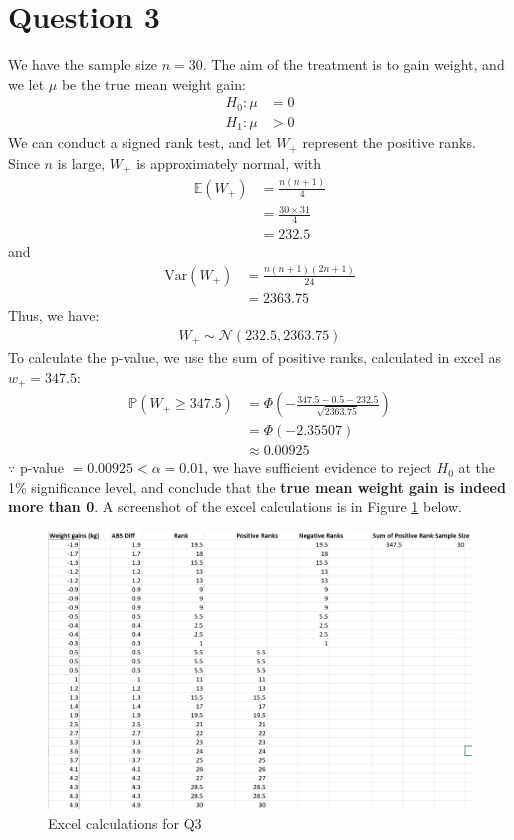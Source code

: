 \documentclass[12pt]{article}
\begin{document}
\section*{Question 3}
We have the sample size $n = 30$. The aim of the treatment is to gain weight, and we let $\mu$ be the true mean weight gain: \begin{align*}
    H_{0}: \mu &= 0 \\ 
    H_{1} : \mu &> 0
\end{align*} We can conduct a signed rank test, and let $W_+$ represent the positive ranks. Since $n$ is large, $W_+$ is approximately normal, with \begin{align*}
    \mathbb{E}(W_+) &= \frac{n(n+1)}{4} \\ 
    &= \frac{30 \times 31}{4} \\ 
    &= 232.5
\end{align*} and \begin{align*}
    \text{Var}(W_+) &= \frac{n(n+1)(2n+1)}{24} \\ 
    &= 2363.75
\end{align*} Thus, we have: \begin{align*}
    W_+ \sim \mathcal{N}(232.5, 2363.75) 
\end{align*} To calculate the p-value, we use the sum of positive ranks, calculated in excel as $w_+ = 347.5$: \begin{align*}
    \mathbb{P}(W_+ \geq 347.5) &= \Phi \left(- \frac{347.5 - 0.5 - 232.5}{\sqrt{2363.75}} \right)\\ 
    &= \Phi \left( - 2.35507 \right) \\ 
    &\approx \boxed{0.00925}
\end{align*} $\because$ p-value $=0.00925 < \alpha = 0.01$, we have sufficient evidence to  reject $H_0$ at the 1\% significance level, and conclude that the \textbf{true mean weight gain is indeed more than 0}. A screenshot of the excel calculations is in Figure \ref{fig:3-excel} below. 

\begin{figure}[H]
    \centering
    \includegraphics[width=\textwidth]{Images/Q3.png}
    \caption{Excel calculations for Q3}
    \label{fig:3-excel}
\end{figure} 
\end{document}
